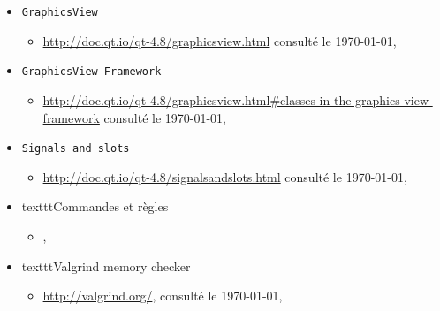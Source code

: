 \documentclass[a4paper,11pt]{report}
\begin{document}
\begin{itemize}
\begin{itemize}
		\end{itemize}
	\item[] \texttt{GraphicsView}
		\begin{itemize}
			\item \url{http://doc.qt.io/qt-4.8/graphicsview.html} consulté le
				\today, \\
		\end{itemize}
	\item[] \texttt{GraphicsView Framework}
		\begin{itemize}
			\item
				\url{http://doc.qt.io/qt-4.8/graphicsview.html#classes-in-the-graphics-view-framework}
				consulté le \today, \\
		\end{itemize}
	\item[] \texttt{Signals and slots}
		\begin{itemize}
			\item \url{http://doc.qt.io/qt-4.8/signalsandslots.html} consulté le
				\today, \\
		\end{itemize}
	\item[] texttt{Commandes et règles}
		\begin{itemize}
			\item {},\\
		\end{itemize}
	\item[] texttt{Valgrind memory checker}
		\begin{itemize}
		\item \url{http://valgrind.org/}, consulté le \today, \\
		\end{itemize}
\end{itemize}
\end{document}
